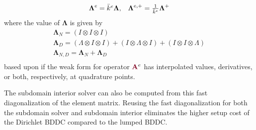 \begin{definition}
\begin{equation}
\begin{array}{c c}
\boldsymbol{\Lambda}^e = \bar{k}^e \boldsymbol{\Lambda},  &  \boldsymbol{\Lambda}^{e, +} = \frac{1}{\bar{k}^e} \boldsymbol{\Lambda}^{+}
\end{array}
\end{equation}
where the value of $\mathbf{\Lambda}$ is given by
\begin{equation}
\begin{array}{c}
\boldsymbol{\Lambda}_N      = \left( I \otimes I \otimes I \right)  \\
\boldsymbol{\Lambda}_D      = \left( \Lambda \otimes I \otimes I\right) + \left( I \otimes \Lambda \otimes I\right) + \left( I \otimes I \otimes \Lambda \right)  \\
\boldsymbol{\Lambda}_{N, D} = \boldsymbol{\Lambda}_N + \boldsymbol{\Lambda}_D  \\
\end{array}
\end{equation}
based upon if the weak form for operator ${\color{burgundy}\mathbf{A}}^e$ has interpolated values, derivatives, or both, respectively, at quadrature points.
\end{definition}

The subdomain interior solver can also be computed from this fast diagonalization of the element matrix.
Reusing the fast diagonalization for both the subdomain solver and subdomain interior eliminates the higher setup cost of the Dirichlet BDDC compared to the lumped BDDC.

